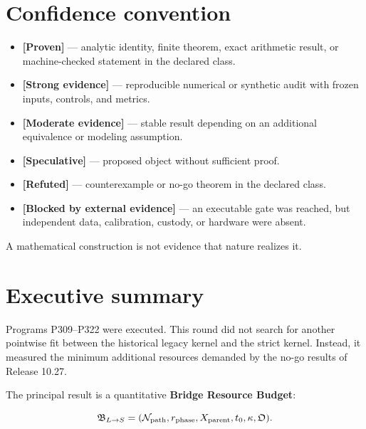 \documentclass[11pt,a4paper,openany]{report}
\newcommand{\statusProven}{\textcolor{fingreen}{[Proven]}}
\newcommand{\statusStrong}{\textcolor{finblue}{[Strong evidence]}}
\newcommand{\statusModerate}{\textcolor{finviolet}{[Moderate evidence]}}
\newcommand{\statusSpeculative}{\textcolor{finorange}{[Speculative]}}
\newcommand{\statusRefuted}{\textcolor{finred}{[Refuted]}}
\begin{document}
\tableofcontents
\clearpage
{}

\chapter*{Confidence convention}

\begin{itemize}
\item 
\textbf{\statusProven{}} --- analytic identity, finite theorem, exact arithmetic result, or machine-checked statement in the declared class.

\item 
\textbf{\statusStrong{}} --- reproducible numerical or synthetic audit with frozen inputs, controls, and metrics.

\item 
\textbf{\statusModerate{}} --- stable result depending on an additional equivalence or modeling assumption.

\item 
\textbf{\statusSpeculative{}} --- proposed object without sufficient proof.

\item 
\textbf{\statusRefuted{}} --- counterexample or no-go theorem in the declared class.

\item 
\textbf{[Blocked by external evidence]} --- an executable gate was reached, but independent data, calibration, custody, or hardware were absent.

\end{itemize}

A mathematical construction is not evidence that nature realizes it.

\chapter{Executive summary}

Programs P309--P322 were executed. This round did not search for another pointwise fit between the historical legacy kernel and the strict kernel. Instead, it measured the minimum additional resources demanded by the no-go results of Release 10.27.

The principal result is a quantitative \textbf{Bridge Resource Budget}:

\[
\mathfrak B_{L\to S}
=
(\mathcal N_{\rm path},
r_{\rm phase},
X_{\rm parent},
t_0,
\kappa,
\mathfrak O).
\]
\end{document}
